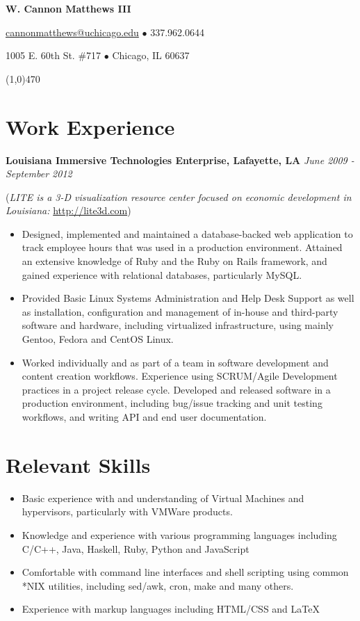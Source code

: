 \documentclass[11pt,letterpaper]{article} %
\begin{document}
 
    \centerline{\LARGE \bf W. Cannon Matthews III} 
    \centerline{ \href{mailto:cannonmatthews@uchicago.edu}{cannonmatthews@uchicago.edu} $\bullet$ 337.962.0644 } 
    \centerline{1005 E. 60th St. \#717 $\bullet$ Chicago, IL 60637 }
    \line(1,0){470} 
%
    \section*{Work Experience} 
        \textbf{Louisiana Immersive Technologies Enterprise, Lafayette, LA} \hfill \textit{June 2009 - September 2012} 

            \begin{footnotesize}
                (\textit{LITE is a 3-D visualization resource center focused on economic development in Louisiana: }\url{http://lite3d.com})
            \end{footnotesize}
            \begin{itemize} 
            \item  Designed, implemented and maintained a database-backed web application to track 
                   employee hours that was used in a production environment. Attained an extensive knowledge of Ruby and the 
                   Ruby on Rails framework, and gained experience with relational databases, particularly MySQL.
            \item  Provided Basic Linux Systems Administration and Help Desk Support as well as installation, configuration and 
                   management of in-house and third-party software and hardware, including virtualized infrastructure, using mainly Gentoo, Fedora and CentOS Linux.
            \item  Worked individually and as part of a team in software development and content creation workflows.
                   Experience using SCRUM/Agile Development practices in a project release cycle. Developed and 
                   released software in a production environment, including bug/issue tracking and unit testing workflows, 
                   and writing API and end user documentation. 
            \end{itemize} 
    \section*{Relevant Skills} 
        \begin{itemize}
        \item Basic experience with and understanding of Virtual Machines and hypervisors, particularly with  VMWare products. 
        \item Knowledge and experience with various programming languages including C/C++, Java, Haskell, Ruby, Python and JavaScript    
        \item Comfortable with command line interfaces and shell scripting using common *NIX utilities, including sed/awk, cron, make and many others. 
        \item Experience with markup languages including HTML/CSS and \LaTeX 
        \end{itemize}          
\end{document}
